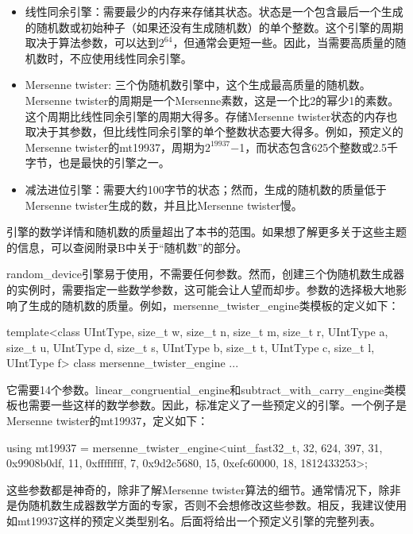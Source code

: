 \begin{itemize}
\item
线性同余引擎：需要最少的内存来存储其状态。状态是一个包含最后一个生成的随机数或初始种子（如果还没有生成随机数）的单个整数。这个引擎的周期取决于算法参数，可以达到$2^{64}$，但通常会更短一些。因此，当需要高质量的随机数时，不应使用线性同余引擎。

\item
Mersenne twister: 三个伪随机数引擎中，这个生成最高质量的随机数。Mersenne twister的周期是一个Mersenne素数，这是一个比2的幂少1的素数。这个周期比线性同余引擎的周期大得多。存储Mersenne twister状态的内存也取决于其参数，但比线性同余引擎的单个整数状态要大得多。例如，预定义的Mersenne twister的mt19937，周期为$2^{19937}$−1，而状态包含625个整数或2.5千字节，也是最快的引擎之一。

\item
减法进位引擎：需要大约100字节的状态；然而，生成的随机数的质量低于Mersenne twister生成的数，并且比Mersenne twister慢。
\end{itemize}

引擎的数学详情和随机数的质量超出了本书的范围。如果想了解更多关于这些主题的信息，可以查阅附录B中关于“随机数”的部分。

random\_device引擎易于使用，不需要任何参数。然而，创建三个伪随机数生成器的实例时，需要指定一些数学参数，这可能会让人望而却步。参数的选择极大地影响了生成的随机数的质量。例如，mersenne\_twister\_engine类模板的定义如下：

\begin{cpp}
template<class UIntType, size_t w, size_t n, size_t m, size_t r,
                UIntType a, size_t u, UIntType d, size_t s,
                UIntType b, size_t t, UIntType c, size_t l, UIntType f>
    class mersenne_twister_engine {...}
\end{cpp}

它需要14个参数。linear\_congruential\_engine和subtract\_with\_carry\_engine类模板也需要一些这样的数学参数。因此，标准定义了一些预定义的引擎。一个例子是Mersenne twister的mt19937，定义如下：

\begin{cpp}
using mt19937 = mersenne_twister_engine<uint_fast32_t, 32, 624, 397, 31,
    0x9908b0df, 11, 0xffffffff, 7, 0x9d2c5680, 15, 0xefc60000, 18,
    1812433253>;
\end{cpp}

这些参数都是神奇的，除非了解Mersenne twister算法的细节。通常情况下，除非是伪随机数生成器数学方面的专家，否则不会想修改这些参数。相反，我建议使用如mt19937这样的预定义类型别名。后面将给出一个预定义引擎的完整列表。







